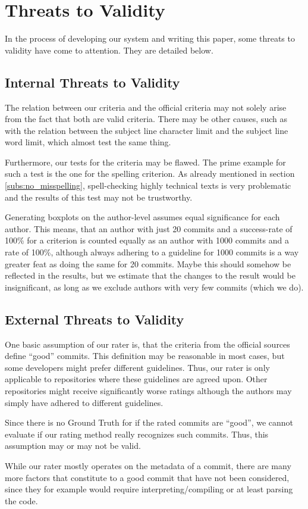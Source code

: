 \section{Threats to Validity}
\label{sec:threats-to-validity}

In the process of developing our system and writing this paper, some threats to validity have come to attention. They are detailed below.

\subsection{Internal Threats to Validity}
\label{sec:internal-threats}

The relation between our criteria and the official criteria may not solely arise from the fact that both are valid criteria. There may be other causes, such as with the relation between the subject line character limit and the subject line word limit, which almost test the same thing.

Furthermore, our tests for the criteria may be flawed. The prime example for such a test is the one for the spelling criterion. As already mentioned in section \ref{subs:no_misspelling}, spell-checking highly technical texts is very problematic and the results of this test may not be trustworthy.

Generating boxplots on the author-level assumes equal significance for each author. This means, that an author with just 20 commits and a success-rate of 100\% for a criterion is counted equally as an author with 1000 commits and a rate of 100\%, although always adhering to a guideline for 1000 commits is a way greater feat as doing the same for 20 commits. Maybe this should somehow be reflected in the results, but we estimate that the changes to the result would be insignificant, as long as we exclude authors with very few commits (which we do).

\subsection{External Threats to Validity}
\label{sec:external-threats}

One basic assumption of our rater is, that the criteria from the official sources define ``good'' commits. This definition may be reasonable in most cases, but some developers might prefer different guidelines. Thus, our rater is only applicable to repositories where these guidelines are agreed upon. Other repositories might receive significantly worse ratings although the authors may simply have adhered to different guidelines.

Since there is no Ground Truth for if the rated commits are ``good'', we cannot evaluate if our rating method really recognizes such commits. Thus, this assumption may or may not be valid.

While our rater mostly operates on the metadata of a commit, there are many more factors that constitute to a good commit that have not been considered, since they for example would require interpreting/compiling or at least parsing the code.
